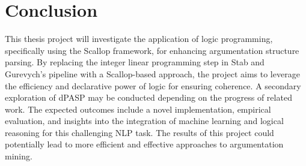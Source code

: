 \documentclass{article}
\begin{document}
\section{Conclusion}

This thesis project will investigate the application of logic programming,
specifically using the Scallop framework, for enhancing argumentation structure
parsing. By replacing the integer linear programming step in Stab and Gurevych's
pipeline with a Scallop-based approach, the project aims to leverage the
efficiency and declarative power of logic for ensuring coherence. A secondary
exploration of dPASP may be conducted depending on the progress of related work.
The expected outcomes include a novel implementation, empirical evaluation, and
insights into the integration of machine learning and logical reasoning for this
challenging NLP task. The results of this project could potentially lead to more
efficient and effective approaches to argumentation mining.



\end{document}
